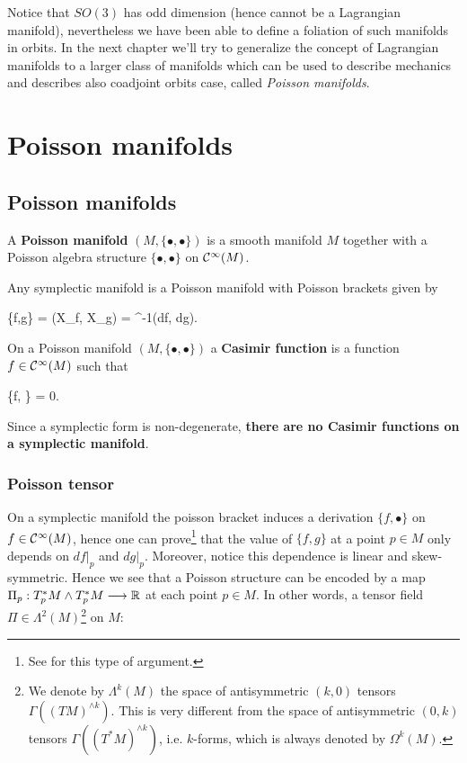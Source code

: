\documentclass[main.tex]{subfiles}
\begin{document}
\begin{remark}
	Notice that $SO(3)$ has odd dimension (hence cannot be a Lagrangian manifold), nevertheless we have been able to define a foliation of such manifolds in orbits. In the next chapter we'll try to generalize the concept of Lagrangian manifolds to a larger class of manifolds which can be used to describe mechanics and describes also coadjoint orbits case, called \emph{Poisson manifolds}.
\end{remark}

\chapter{Poisson manifolds}
\section{Poisson manifolds}
\begin{definition}
	A \textbf{Poisson manifold} $(M, \{\bullet,\bullet\})$ is a smooth manifold $M$ together with a Poisson algebra structure $\{\bullet,\bullet\}$ on $\mathcal{C}^\infty(M)$.
\end{definition}

\begin{example}
	Any symplectic manifold is a Poisson manifold with Poisson brackets given by
	\begin{eqalign}
		\{f,g\} = \omega(X_f, X_g) = \omega^{-1}(df, dg).
	\end{eqalign}
\end{example}

\begin{definition}
	On a Poisson manifold $(M, \{\bullet,\bullet\})$ a \textbf{Casimir function} is a function $f \in \mathcal{C}^\infty(M)$ such that
	\begin{eqalign}
		\{f, \bullet\} = 0.
	\end{eqalign}
\end{definition}

\begin{remark}
	Since a symplectic form is non-degenerate, \textbf{there are no Casimir functions on a symplectic manifold}.
\end{remark}

\subsection{Poisson tensor}
On a symplectic manifold the poisson bracket induces a derivation $\{f, \bullet\}$ on $f \in \mathcal{C}^\infty(M)$, hence one can prove\footnote{See \cite[Section 33.1]{michor2008} for this type of argument.} that the value of $\{f,g\}$ at a point $p \in M$ only depends on $df\vert_p$ and $dg\vert_p$. Moreover, notice this dependence is linear and skew-symmetric. Hence we see that a Poisson structure can be encoded by a map $\Pi_p : T^*_pM \wedge T^*_pM \longrightarrow \mathbb{R}$ at each point $p \in M$. In other words, a tensor field $\Pi \in \Lambda^2(M)$\footnote{We denote by $\Lambda^k(M)$ the space of antisymmetric $(k,0)$ tensors $\Gamma((TM)^{\wedge k})$. This is very different from the space of antisymmetric $(0,k)$ tensors $\Gamma((T^*M)^{\wedge k})$, i.e. $k$-forms, which is always denoted by $\Omega^k(M)$.} on $M$:
\end{document}
